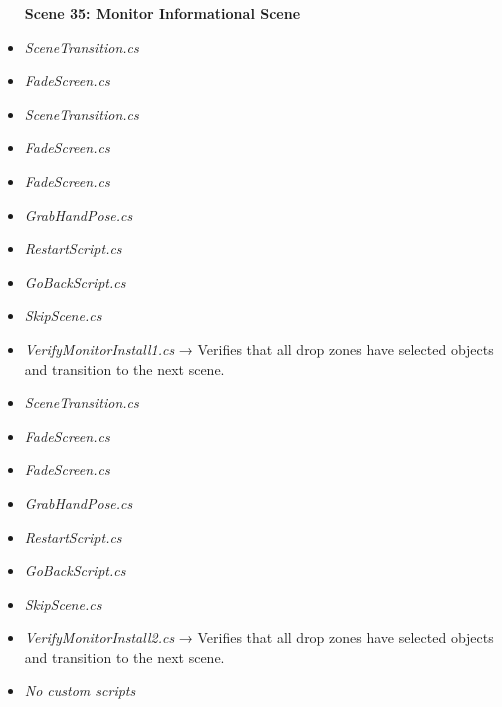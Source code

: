 \documentclass[10pt,twocolumn]{article}
\begin{document}
\begin{itemize}
    \textbf{Scene 35: Monitor Informational Scene}\\
    \item \textit{SceneTransition.cs}\\
    \item \textit{FadeScreen.cs}
\end{itemize}

\begin{itemize}
    \textbf{Scene 36:  Monitor Motions Scene 1}\\
    \item \textit{SceneTransition.cs}\\
    \item \textit{FadeScreen.cs}
\end{itemize}

\begin{itemize}
    \textbf{Scene 37:  Monitor Install Scene 1}\\
    \item \textit{FadeScreen.cs}\\
    \item \textit{GrabHandPose.cs}\\
    \item \textit{RestartScript.cs}\\
    \item \textit{GoBackScript.cs}\\
    \item \textit{SkipScene.cs}\\
    \item \textit{VerifyMonitorInstall1.cs} → Verifies that all drop zones have selected objects and transition to the next scene. 
\end{itemize}

\begin{itemize}
    \textbf{Scene 38:  Monitor Motions Scene 2}\\
    \item \textit{SceneTransition.cs}\\
    \item \textit{FadeScreen.cs}
\end{itemize}

\begin{itemize}
    \textbf{Scene 39:  Monitor Install Scene 2}\\
    \item \textit{FadeScreen.cs}\\
    \item \textit{GrabHandPose.cs}\\
    \item \textit{RestartScript.cs}\\
    \item \textit{GoBackScript.cs}\\
    \item \textit{SkipScene.cs}\\
    \item \textit{VerifyMonitorInstall2.cs} → Verifies that all drop zones have selected objects and transition to the next scene. 
\end{itemize}

\begin{itemize}
    \textbf{Scene 40: Completed Build Scene}\\
    \item \textit{No custom scripts}
\end{itemize}
\end{document}
